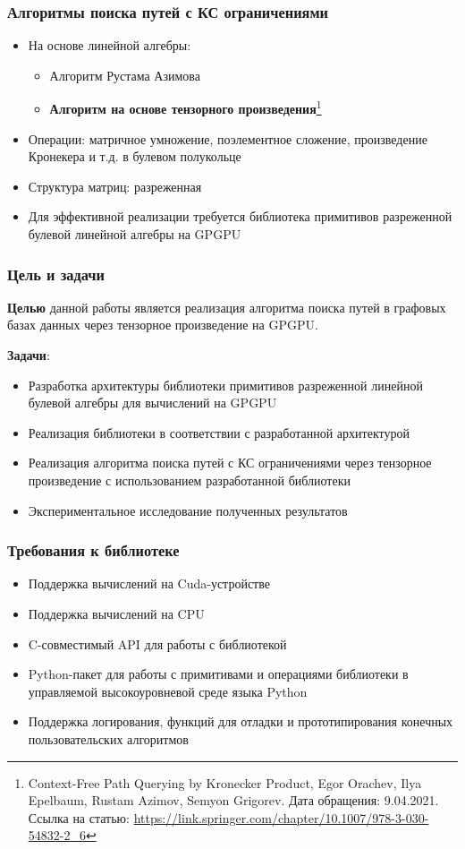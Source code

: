 \documentclass[xcolor=table,english]{beamer}
\begin{document}
\begin{frame}[fragile] \frametitle{Алгоритмы поиска путей с КС ограничениями}
    \begin{itemize}
        \item На основе линейной алгебры:
        {
        \begin{itemize}
            \item Алгоритм Рустама Азимова
            \item \textbf{Алгоритм на основе тензорного произведения}\footnote{Context-Free Path Querying by Kronecker Product, Egor Orachev, Ilya Epelbaum, Rustam  Azimov, Semyon Grigorev. Дата обращения: 9.04.2021. Ссылка на статью: \url{https://link.springer.com/chapter/10.1007/978-3-030-54832-2\_6}}
        \end{itemize}
        }
        \item Операции: матричное умножение, поэлементное сложение, произведение Кронекера и т.д. в булевом полукольце
        \item Структура матриц: разреженная
        \item Для эффективной реализации требуется библиотека примитивов разреженной булевой линейной алгебры на GPGPU
    \end{itemize}
\end{frame}

\begin{frame}[fragile] \frametitle{Цель и задачи}
    \textbf{Целью} данной работы является реализация алгоритма поиска путей в графовых базах данных через тензорное произведение на GPGPU.
    
    \textbf{Задачи}:
    \begin{itemize}
        \item Разработка архитектуры библиотеки примитивов разреженной линейной булевой алгебры для вычислений на GPGPU
        \item Реализация библиотеки в соответствии с разработанной архитектурой
        \item Реализация алгоритма поиска путей с КС ограничениями через тензорное произведение с использованием разработанной библиотеки
        \item Экспериментальное исследование полученных результатов
    \end{itemize}
\end{frame}

\begin{frame}[fragile] \frametitle{Требования к библиотеке}
    \begin{itemize}
        \item Поддержка вычислений на Cuda-устройстве
        \item Поддержка вычислений на CPU
        \item C-совместимый API для работы с библиотекой
        \item Python-пакет для работы с примитивами и операциями библиотеки в управляемой высокоуровневой среде языка Python
        \item Поддержка логирования, функций для отладки и прототипирования конечных пользовательских алгоритмов
    \end{itemize}
\end{frame}
\end{document}
